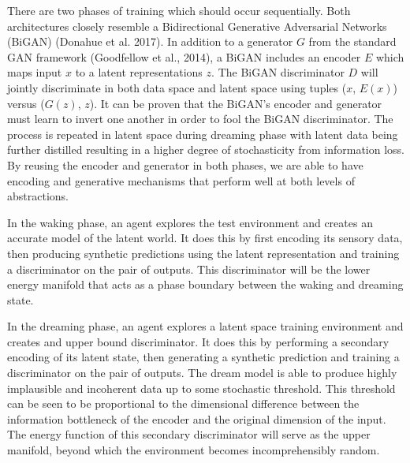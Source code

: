 \documentclass{article}
\begin{document}
There are two phases of training which should occur sequentially. Both architectures closely resemble a Bidirectional Generative Adversarial Networks (BiGAN) (Donahue et al. 2017). In addition to a generator $G$ from the standard GAN framework (Goodfellow et al., 2014), a BiGAN includes an encoder $E$ which maps input $x$ to a latent representations $z$. The BiGAN discriminator $D$  will jointly discriminate in both data space and latent space using tuples ($x$, $E(x)$) versus ($G(z)$, $z$). It can be proven that the BiGAN's encoder and generator must learn to invert one another in order to fool the BiGAN discriminator. The process is repeated in latent space during dreaming phase with latent data being further distilled resulting in a higher degree of stochasticity from information loss. By reusing the encoder and generator in both phases, we are able to have encoding and generative mechanisms that perform well at both levels of abstractions. 

In the waking phase, an agent explores the test environment and creates an accurate model of the latent world. It does this by first encoding its sensory data, then producing synthetic predictions using the latent representation and training a discriminator on the pair of outputs. This discriminator will be the lower energy manifold that acts as a phase boundary between the waking and dreaming state. 

In the dreaming phase, an agent explores a latent space training environment and creates and upper bound discriminator. It does this by performing a secondary encoding of its latent state, then generating a synthetic prediction and training a discriminator on the pair of outputs. The dream model is able to produce highly implausible and incoherent data up to some stochastic threshold. This threshold can be seen to be proportional to the dimensional difference between the information bottleneck of the encoder and the original dimension of the input. The energy function of this secondary discriminator will serve as the upper manifold, beyond which the environment becomes incomprehensibly random.

\end{document}

